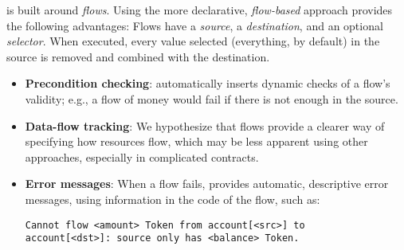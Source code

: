 \documentclass[dvipsnames, sigplan, screen]{acmart}
\begin{document}
\langName is built around \emph{flows}. %
Using the more declarative, \emph{flow-based} approach provides the following advantages:
Flows have a \emph{source}, a \emph{destination}, and an optional \emph{selector}.
When executed, every value selected (everything, by default) in the source is removed and combined with the destination.
\begin{itemize}
    \item \textbf{Precondition checking}: \langName automatically inserts dynamic checks of a flow's validity; e.g., a flow of money would fail if there is not enough in the source. %
    \item \textbf{Data-flow tracking}: We hypothesize that flows provide a clearer way of specifying how resources flow, which may be less apparent using other approaches, especially in complicated contracts. %
    \item \textbf{Error messages}: When a flow fails, \langName provides automatic, descriptive error messages, using information in the code of the flow, such as:
\vspace{-0.5em}
\begin{lstlisting}[numbers=none, basicstyle=\small\ttfamily, xrightmargin=-5em]
Cannot flow <amount> Token from account[<src>] to
account[<dst>]: source only has <balance> Token.
\end{lstlisting}
\vspace{-0.5em}
\end{itemize}
\end{document}
